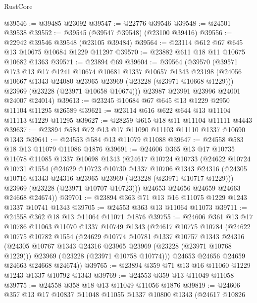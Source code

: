 \begin{lexlean}{RustCore}
\begin{coremodule}
@39546 := @39485 @23092
@39547 := @22776 @39546
@39548 := @24501 @39538
@39552 := @39545 (@39547 @39548) (@23100 @39416)
@39556 := @22942 @39546 @39548 (@23105 @39484)
@39564 := @23114 @612 @67 @645 @13 @10675 @10684 @1229 @11297
@39570 := @23882 @611 @18 @11 @10675 @10682 @1363
@39571 := @23894 @69
@39604 := @39564
    (@39570
      (@39571
        @173
        @13
        @17
        @1241
        @10674
        @10681
        @1337
        @10657
        @1343
        @23198
        (@24056 @10667 @1343 @24080 @23965 @23969 (@23228 (@23971 @10668 @1229)))
        @23969
        (@23228 (@23971 @10658 @10674)))
      @23987
      @23991
      @23996
      @24001
      @24007
      @24014)
@39613 := @23245 @10684 @67 @645 @13 @1229 @2950 @11104 @11295 @26589
@39621 := @23114 @616 @622 @644 @13 @11104 @11113 @1229 @11295
@39627 := @28259 @615 @18 @11 @11104 @11111 @4443
@39637 := @23894 @584 @72 @13 @17 @11090 @11103 @11110 @1337 @10690 @1343
@39641 := @24553 @584 @13 @11079 @11088
@39647 := @24558 @583 @18 @13 @11079 @11086 @1876
@39691 := @24606
    @365
    @13
    @17
    @10735
    @11078
    @11085
    @1337
    @10698
    @1343
    (@24617
      @10724
      @10733
      (@24622
        @10724
        @10731
        @1554
        (@24629
          @10723
          @10730
          @1337
          @10706
          @1343
          @24316
          (@24305 @10716 @1343 @24316 @23965 @23969 (@23228 (@23971 @10717 @1229)))
          @23969
          (@23228 (@23971 @10707 @10723)))
        @24653
        @24656
        @24659
        @24663
        @24668
        @24674))
@39701 := @23894 @363 @71 @13 @16 @11075 @1229 @1243 @1337 @10741 @1343
@39705 := @24553 @363 @13 @11064 @11073
@39711 := @24558 @362 @18 @13 @11064 @11071 @1876
@39755 := @24606
    @361
    @13
    @17
    @10786
    @11063
    @11070
    @1337
    @10749
    @1343
    (@24617
      @10775
      @10784
      (@24622
        @10775
        @10782
        @1554
        (@24629
          @10774
          @10781
          @1337
          @10757
          @1343
          @24316
          (@24305 @10767 @1343 @24316 @23965 @23969 (@23228 (@23971 @10768 @1229)))
          @23969
          (@23228 (@23971 @10758 @10774)))
        @24653
        @24656
        @24659
        @24663
        @24668
        @24674))
@39765 := @23894 @359 @71 @13 @16 @11060 @1229 @1243 @1337 @10792 @1343
@39769 := @24553 @359 @13 @11049 @11058
@39775 := @24558 @358 @18 @13 @11049 @11056 @1876
@39819 := @24606
    @357
    @13
    @17
    @10837
    @11048
    @11055
    @1337
    @10800
    @1343
    (@24617
      @10826

\end{coremodule}
\end{lexlean}
